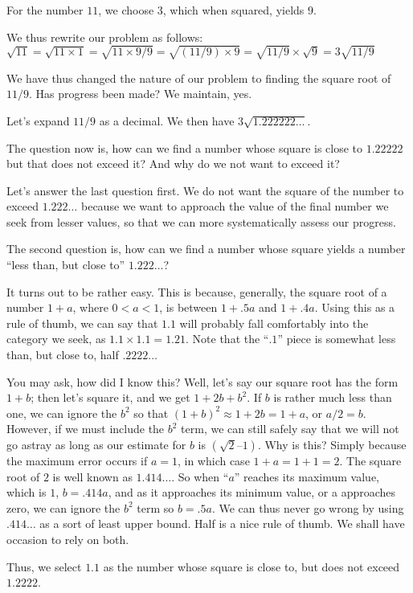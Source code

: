 \documentclass[12pt]{article}
\begin{document}
For the number $11$, we choose $3$, which when squared, yields $9$.

We thus rewrite our problem as follows: $\sqrt{11} = \sqrt{11\times 1} = \sqrt{11\times 9/9} = \sqrt{(11/9) \times 9} = \sqrt{11/9} \times \sqrt{9} = 3 \sqrt{11/9}$

We have thus changed the nature of our problem to finding the square root of $11/9$. Has progress been made? We maintain, yes.

Let’s expand $11/9$ as a decimal. We then have $3\sqrt{1.222222\ldots}$.

The question now is, how can we find a number whose square is close to $1.22222$ but that does not exceed it? And why do we not want to exceed it?

Let’s answer the last question first. We do not want the square of the number to exceed $1.222\ldots$ because we want to approach the value of the final number we seek from lesser values, so that we can more systematically assess our progress. 

The second question is, how can we find a number whose square yields a number “less than, but close to” $1.222\ldots$?

It turns out to be rather easy. This is because, generally, the square root of a number $1 + a$, where $0 < a < 1$, is between $1 + .5a$ and $1 + .4a$. Using this as a rule of thumb, we can say that $1.1$ will probably fall comfortably into the category we seek, as $1.1 \times 1.1 = 1.21$. Note that the “$.1$” piece is somewhat less than, but close to, half $.2222\ldots$

You may ask, how did I know this? Well, let’s say our square root has the form $1 + b$; then let’s square it, and we get $1 + 2b + b^2$. If $b$ is rather much less than one, we can ignore the
 $b^2$ so that $(1 + b)^2 \approx 1 + 2b = 1 + a$, or $a/2 = b$.  However, if we must include the $b^2$ term, we can still safely say that we will not go astray as long as our estimate for $b$ is $(\sqrt{2} – 1)$.  Why is this?  Simply because the maximum error occurs if $a = 1$, in which case $1 + a = 1 + 1 = 2$. The square root of $2$ is well known as $1.414\ldots$. So when “$a$” reaches its maximum value, which is $1$, $b = .414a$, and as it approaches its minimum value, or a approaches zero, we can ignore the $b^2$ term so $b = .5a$. We can thus never go wrong by using $.414\ldots$  as a sort of least upper bound. Half is a nice rule of thumb. We shall have occasion to rely on both.

Thus, we select $1.1$ as the number whose square is close to, but does not exceed $1.2222$.
\end{document}
